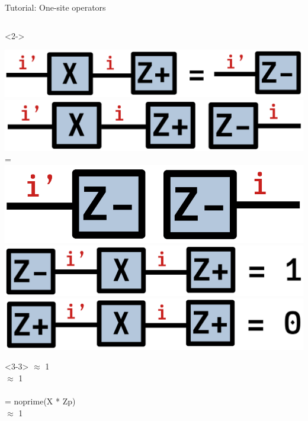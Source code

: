 \begin{frame}[fragile]{Tutorial: One-site operators}
\begin{columns}
\begin{column}{4.5cm}
\begin{onlyenv}<2->
\vspace*{0.0cm}
\begin{center}
\includegraphics[width=1.0\textwidth]{
  slides/assets/XZp.png
} \\
\includegraphics[width=1.0\textwidth]{
  slides/assets/outer_XZp_Zm.png
} \\
=
\includegraphics[width=1.0\textwidth]{
  slides/assets/outer_Zm_Zm.png
} \\
\includegraphics[width=1.0\textwidth]{
  slides/assets/ZmXZp.png
} \\
\includegraphics[width=1.0\textwidth]{
  slides/assets/ZpXZp.png
}
\end{center}
\vspace*{0.0cm}
\end{onlyenv}

\begin{onlyenv}<3-3>
$\approx$ 1 \\
$\approx$ 1 \\
~\\
= noprime(X * Zp) \\
$\approx$ 1 \\
\end{onlyenv}


\end{column}
\end{columns}
\end{frame}
